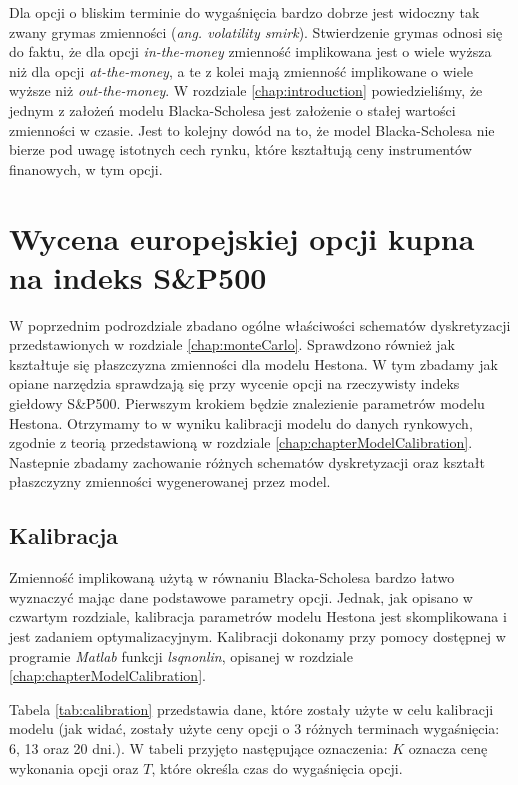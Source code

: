 \documentclass{pracamgr}
\begin{document}
Dla opcji o bliskim terminie do wygaśnięcia bardzo dobrze jest widoczny
tak zwany grymas zmienności (\textit{ang. volatility smirk}). Stwierdzenie grymas 
odnosi się do faktu, że dla opcji \textit{in-the-money} zmienność implikowana jest o 
wiele wyższa niż dla opcji \textit{at-the-money}, a te z kolei mają zmienność 
implikowane o wiele wyższe niż \textit{out-the-money}.
W rozdziale \ref{chap:introduction} powiedzieliśmy, że jednym z założeń
modelu Blacka-Scholesa jest założenie o stałej wartości zmienności w czasie. 
Jest to kolejny dowód na to, że model Blacka-Scholesa nie bierze pod uwagę
istotnych cech rynku, które kształtują ceny instrumentów finanowych, w tym opcji.




\section{Wycena europejskiej opcji kupna na indeks S\&P500}

W poprzednim podrozdziale zbadano ogólne właściwości schematów dyskretyzacji przedstawionych
w rozdziale \ref{chap:monteCarlo}. Sprawdzono również jak kształtuje się płaszczyzna 
zmienności dla modelu Hestona. 
W tym zbadamy jak opiane narzędzia sprawdzają się przy wycenie opcji na rzeczywisty indeks 
giełdowy S\&P500.
Pierwszym krokiem będzie znalezienie parametrów modelu Hestona. Otrzymamy to w wyniku 
kalibracji modelu do danych rynkowych, zgodnie z teorią 
przedstawioną w rozdziale \ref{chap:chapterModelCalibration}.
Nastepnie zbadamy zachowanie różnych schematów dyskretyzacji oraz kształt płaszczyzny
zmienności wygenerowanej przez model.




\subsection{Kalibracja}

Zmienność implikowaną użytą w równaniu Blacka-Scholesa 
bardzo łatwo wyznaczyć mając dane podstawowe parametry 
opcji. Jednak, jak opisano w czwartym rozdziale, 
kalibracja parametrów modelu Hestona jest skomplikowana i jest
zadaniem optymalizacyjnym. Kalibracji dokonamy przy pomocy dostępnej w 
programie \textit{Matlab} funkcji \textit{lsqnonlin}, 
opisanej w rozdziale \ref{chap:chapterModelCalibration}.


Tabela \ref{tab:calibration} przedstawia dane, które
zostały użyte w celu kalibracji modelu (jak widać, zostały użyte ceny 
opcji o 3 różnych terminach wygaśnięcia: 
6, 13 oraz 20 dni.). W tabeli przyjęto następujące oznaczenia: $K$ oznacza cenę wykonania opcji
oraz $T$, które określa czas do wygaśnięcia opcji.
\end{document}
